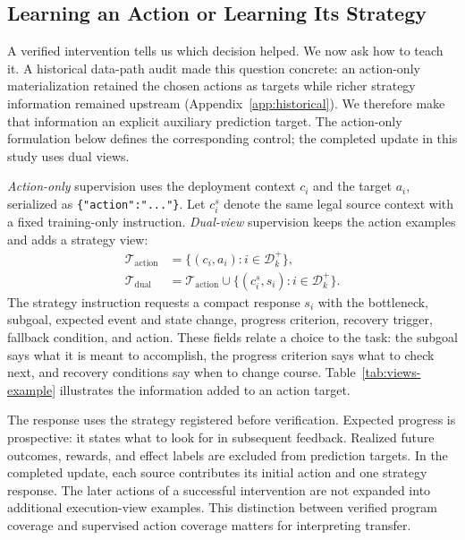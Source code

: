 \subsection{Learning an Action or Learning Its Strategy}
\label{sec:internalization}
A verified intervention tells us which decision helped. We now ask how to
teach it. A historical data-path audit made this question concrete: an
action-only materialization retained the chosen actions as targets while
richer strategy information remained upstream
(Appendix~\ref{app:historical}). We therefore make that information an explicit auxiliary prediction
target. The action-only formulation below defines the corresponding
control; the completed update in this study uses dual views.

\emph{Action-only} supervision uses the deployment context $c_i$ and the
target $a_i$, serialized as \texttt{\{"action":"..."\}}. Let $c_i^s$
denote the same legal source context with a fixed training-only instruction.
\emph{Dual-view} supervision keeps the action examples and adds a strategy view:
\begin{equation}
\begin{aligned}
\mathcal T_{\mathrm{action}}&=\{(c_i,a_i):i\in\mathcal D_k^+\},\\
\mathcal T_{\mathrm{dual}}&=\mathcal T_{\mathrm{action}}\cup
\{(c_i^s,s_i):i\in\mathcal D_k^+\}.
\end{aligned}
\label{eq:training-views}
\end{equation}
The strategy instruction requests a compact response $s_i$ with
the bottleneck, subgoal, expected event and state change, progress criterion,
recovery trigger, fallback condition, and action. These fields relate a
choice to the task: the subgoal says what it is meant to accomplish, the
progress criterion says what to check next, and recovery conditions say
when to change course. Table~\ref{tab:views-example} illustrates the
information added to an action target.


The response uses the strategy registered before verification. Expected
progress is prospective: it states what to look for in subsequent feedback.
Realized future outcomes, rewards, and effect labels are excluded from
prediction targets. In the completed update, each source contributes its initial action and
one strategy response. The later actions of a successful intervention are
not expanded into additional execution-view examples. This distinction
between verified program coverage and supervised action coverage matters
for interpreting transfer.

